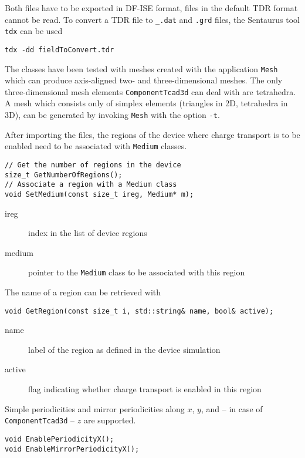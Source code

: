 Both files have to be exported in DF-ISE format, 
files in the default TDR format cannot be read.
To convert a TDR file to \texttt{\_.dat} and \texttt{.grd} files, the
Sentaurus tool \texttt{tdx} can be used
\begin{lstlisting}
tdx -dd fieldToConvert.tdr
\end{lstlisting}

The classes have been tested with meshes created with the application 
\texttt{Mesh} which can produce axis-aligned 
two- and three-dimensional meshes.
The only three-dimensional mesh elements \texttt{ComponentTcad3d} 
can deal with are tetrahedra. 
A mesh which consists only of simplex elements 
(triangles in 2D, tetrahedra in 3D), 
can be generated by invoking \texttt{Mesh} with the option \texttt{-t}.

After importing the files, 
the regions of the device where charge transport is to be enabled 
need to be associated with \texttt{Medium} classes. 
\begin{lstlisting}
// Get the number of regions in the device
size_t GetNumberOfRegions();
// Associate a region with a Medium class
void SetMedium(const size_t ireg, Medium* m);
\end{lstlisting}
\begin{description}
  \item[ireg]
  index in the list of device regions
  \item[medium]
  pointer to the \texttt{Medium} class to be associated with this region
\end{description}

The name of a region can be retrieved with
\begin{lstlisting}
void GetRegion(const size_t i, std::string& name, bool& active);
\end{lstlisting}
\begin{description}
  \item[name] 
  label of the region as defined in the device simulation
  \item[active] 
  flag indicating whether charge transport is enabled 
  in this region
\end{description}

Simple periodicities and mirror periodicities along 
\(x\), \(y\), and -- in case of \texttt{ComponentTcad3d} -- \(z\) 
are supported. 
\begin{lstlisting}
void EnablePeriodicityX();
void EnableMirrorPeriodicityX();
\end{lstlisting}

